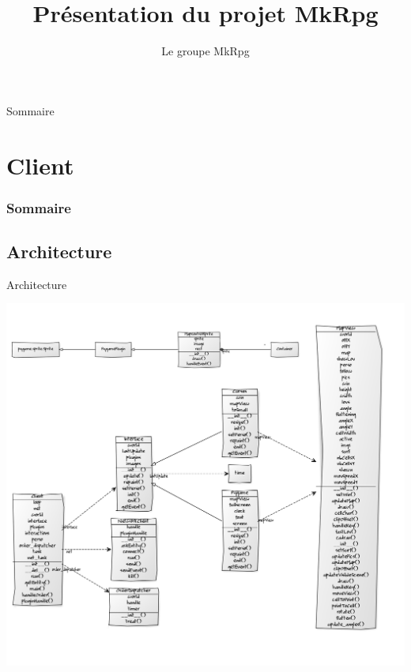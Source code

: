 \documentclass[11pt]{beamer}
\author{Le groupe MkRpg}
\title{Présentation du projet MkRpg}
\begin{document}
\begin{frame}
\titlepage
\end{frame}

\begin{frame}{Sommaire}
\tableofcontents
\end{frame}




\section{Client}
    \begin{frame}
        \frametitle{Sommaire}
        \tableofcontents[currentsection]
    \end{frame}

\subsection{Architecture}
\begin{frame}{Architecture}
	\begin{center}\includegraphics[scale=0.21]{uml_pygame.png}\end{center}
\end{frame}
\end{document}
